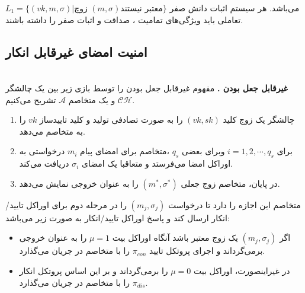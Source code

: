 \documentclass[12pt,a4paper]{article}
\begin{document}
$L_1 = \{ (vk,m,\sigma) | 
\text{زوچ 
	$(m,\sigma)$
	معتبر نیستند
}
\}$
می‌باشد. هر سیستم اثبات دانش صفر تعاملی باید ویژگی‌های تمامیت ، صداقت و اثبات صفر را داشته باشند.


\subsection{امنیت امضای غیرقابل انکار}
\\
\textbf{غیرقابل جعل بودن .}
مفهوم غیرقابل جعل بودن را توسط بازی زیر بین یک چالشگر 
$\mathcal{CH}$
 و یک متخاصم
$\mathcal{A}$
تشریح می‌کنیم.
\begin{enumerate}
	
	\item 
	چالشگر یک زوج کلید
	$(vk,sk)$
	را به صورت تصادفی تولید و کلید تاییدساز 
	$vk$
	را به متخاصم می‌دهد.
	\item 
	برای 
	$i = 1,2,\cdots, q_s$
	وبرای بعضی
	$q_s$
	،متخاصم برای امضای پیام 
	$m_i$
	درخواستی به اوراکل امضا می‌فرستد و متعاقبا یک امضای
	$\sigma_i$
	دریافت می‌کند.
	\item 
	در پایان، متخاصم زوج جعلی 
	$(m^*,{\sigma}^*)$
	را به عنوان خروجی نمایش می‌دهد.
\end{enumerate}
متخاصم این اجازه را دارد تا درخواست
$(m_j,\sigma_j)$
را در مرحله دوم برای اوراکل تایید/انکار ارسال کند و پاسخ اوراکل تایید/انکار به صورت زیر می‌باشد:
\begin{itemize}
	\item 
	اگر 
	$(m_j,\sigma_j)$
	یک زوج معتبر باشد آنگاه اوراکل بیت
	$\mu = 1$
	را به عنوان خروجی برمی‌گرداند و اجرای پروتکل تایید
	$\pi_{con}$ 
	را با متخاصم در جریان می‌گذارد.
	
	\item 
	در غیر‌اینصورت، اوراکل بیت
	$\mu = 0$
	را برمی‌گرداند و بر این اساس پروتکل انکار 
	$\pi_{dis}$
	را با متخاصم در جریان می‌گذارد.
\end{itemize}
\end{document}
